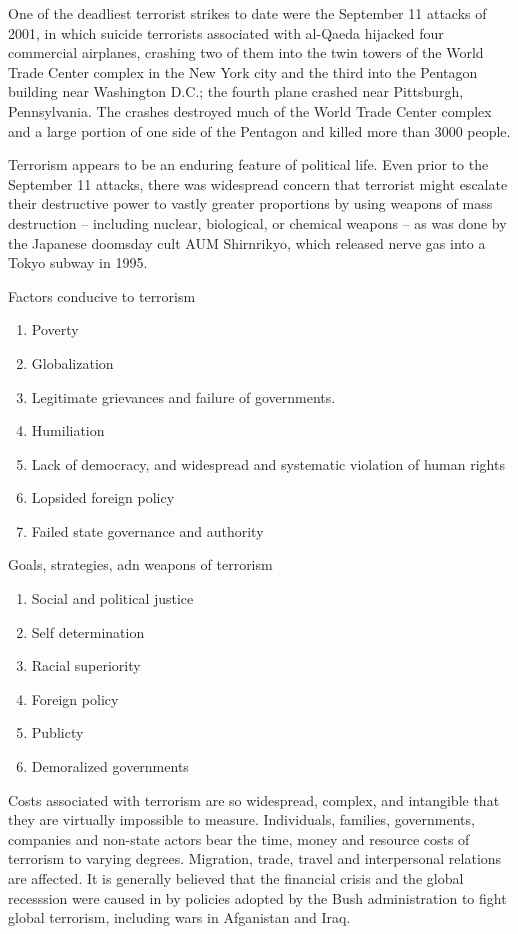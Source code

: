 \documentclass[
  openany]{book}
\providecommand{\tightlist}{%
  \setlength{\itemsep}{0pt}\setlength{\parskip}{0pt}}
\begin{document}
One of the deadliest terrorist strikes to date were the September 11 attacks of 2001, in which suicide terrorists associated with al-Qaeda hijacked four commercial airplanes, crashing two of them into the twin towers of the World Trade Center complex in the New York city and the third into the Pentagon building near Washington D.C.; the fourth plane crashed near Pittsburgh, Pennsylvania. The crashes destroyed much of the World Trade Center complex and a large portion of one side of the Pentagon and killed more than 3000 people.

Terrorism appears to be an enduring feature of political life. Even prior to the September 11 attacks, there was widespread concern that terrorist might escalate their destructive power to vastly greater proportions by using weapons of mass destruction -- including nuclear, biological, or chemical weapons -- as was done by the Japanese doomsday cult AUM Shirnrikyo, which released nerve gas into a Tokyo subway in 1995.

Factors conducive to terrorism

\begin{enumerate}
\def\labelenumi{\arabic{enumi}.}
\tightlist
\item
  Poverty
\item
  Globalization
\item
  Legitimate grievances and failure of governments.
\item
  Humiliation
\item
  Lack of democracy, and widespread and systematic violation of human rights
\item
  Lopsided foreign policy
\item
  Failed state governance and authority
\end{enumerate}

Goals, strategies, adn weapons of terrorism

\begin{enumerate}
\def\labelenumi{\arabic{enumi}.}
\tightlist
\item
  Social and political justice
\item
  Self determination
\item
  Racial superiority
\item
  Foreign policy
\item
  Publicty
\item
  Demoralized governments
\end{enumerate}

Costs associated with terrorism are so widespread, complex, and intangible that they are virtually impossible to measure. Individuals, families, governments, companies and non-state actors bear the time, money and resource costs of terrorism to varying degrees. Migration, trade, travel and interpersonal relations are affected. It is generally believed that the financial crisis and the global recesssion were caused in by policies adopted by the Bush administration to fight global terrorism, including wars in Afganistan and Iraq.
\end{document}
